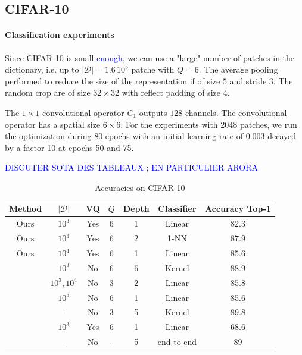\documentclass{article}
\newcommand{\Edouard}[1]{\textcolor{blue}{#1}}
\begin{document}
\subsection{CIFAR-10}

\paragraph{Classification experiments} Since CIFAR-10 is small \Edouard{enough}, we can use a "large" number of patches in the dictionary, i.e. up to $|\mathcal{D}|=1.6\,10^5$ patche with $Q = 6$.
The average pooling performed to reduce the size of the representation if of size $5$ and stride $3$.
The random crop are of size $32\times 32$ with reflect padding of size $4$.

The $1 \times 1$ convolutional operator $C_1$ outputs $128$ channels.
The convolutional operator has a spatial size $6 \times 6$.
For the experiments with 2048 patches, we run the optimization during 80 epochs with an initial learning rate of $0.003$ decayed by a factor 10 at epochs 50 and 75.


\Edouard{DISCUTER SOTA DES TABLEAUX ; EN PARTICULIER ARORA}

\begin{table}[h]
  \caption{Accuracies on CIFAR-10}
  \label{accuracy}
  \centering
  \begin{tabular}{|c|c|c|c|c|c|c|}
    \hline 
    Method&$|\mathcal{D}|$&VQ&$Q$&Depth &Classifier& Accuracy Top-1 \\
    \hline 
    \hline 
    Ours&$10^3$ & Yes&6&1&Linear&82.3 \\
    \hline
    Ours&$10^3$ & Yes& 6&2&1-NN&87.9\\
    \hline 
    Ours&$10^4$ & Yes&6&1&Linear&85.6\\
    \hline 
    \cite{li2019enhanced}&$10^3$& No&6&6&Kernel &88.9\\
    \hline 
    \cite{mairal2016end}&$10^3, 10^4$& No&3 & 2& Linear &85.8\\
    \hline 
    \cite{recht2019imagenet}&$10^5$ & No& 6&1&Linear &85.6\\
    \hline 
    \cite{shankar2020neural}&-& No&3&5&Kernel &89.8\\
    \hline 
    \cite{coates2011analysis}&$10^3$& Yes&6 & 1&Linear &68.6\\
    \hline
    \cite{krizhevsky2012imagenet}&-& No&-&5&end-to-end&89\\
    \hline
  \end{tabular}
\end{table}
\end{document}
